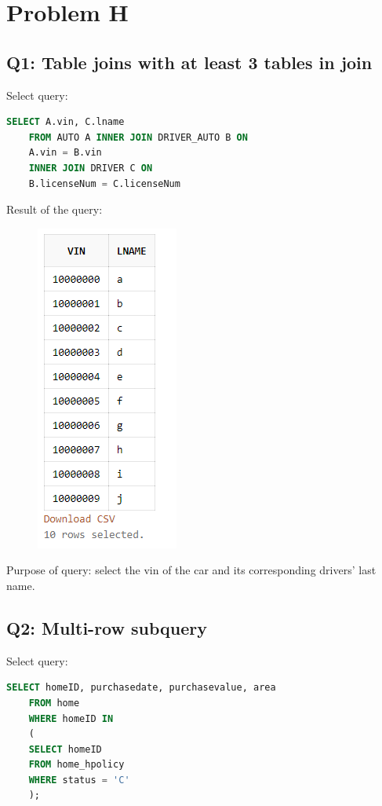 \documentclass[12pt,english, openany]{book}
\begin{document}
\section{Problem H}
\subsection{Q1: Table joins with at least 3 tables in join}
Select query: 
\begin{lstlisting}[language=SQL]
    SELECT A.vin, C.lname
    FROM AUTO A INNER JOIN DRIVER_AUTO B ON
    A.vin = B.vin
    INNER JOIN DRIVER C ON
    B.licenseNum = C.licenseNum
\end{lstlisting}

Result of the query:
    \begin{figure}[H]
        \centering
        \includegraphics[scale=0.6]{h1.png}
    \end{figure}
    
Purpose of query: select the vin of the car and its corresponding drivers' last name.

\subsection{Q2: Multi-row subquery}
Select query: 
\begin{lstlisting}[language=SQL]
    SELECT homeID, purchasedate, purchasevalue, area 
    FROM home 
    WHERE homeID IN
    (
    SELECT homeID 
    FROM home_hpolicy 
    WHERE status = 'C'
    );
\end{lstlisting}
\end{document}

